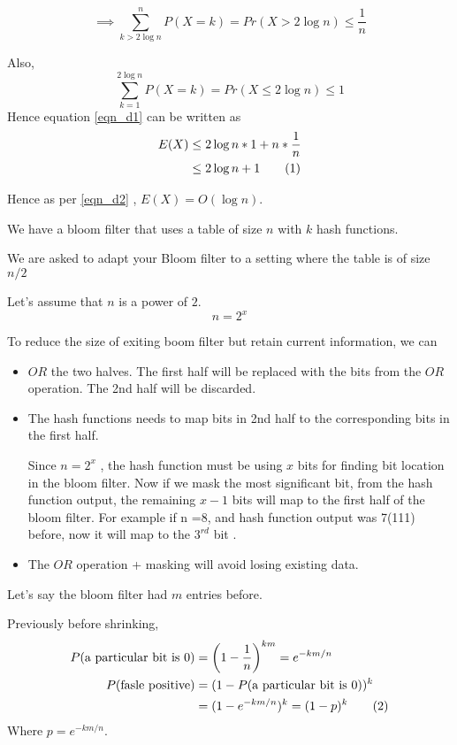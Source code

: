 \documentclass{homeworg}
\newcommand\numberthis{\addtocounter{equation}{1}\tag{\theequation}}
\begin{document}
\[
    \implies \sum_{k > 2\log n}^n P(X=k) = Pr({X> 2 \log n}) \le \frac{1}{n}
\]

Also,
\[
    \sum_{k=1}^{2\log n} P(X=k) = Pr({X\le 2 \log n}) \le 1
\]
Hence equation \ref{eqn_d1} can be written as
\begin{align*}
    E(X) &\le 2 \log n \ast 1 +n \ast \frac{1}{n}\\
    &\le 2\log n +1 \numberthis\label{eqn_d2}
\end{align*}

Hence as per \ref{eqn_d2} ,     $E(X) = O(\log n)$.

\newpage
\exercise
We have a bloom filter that uses a table of size $n$ with $k$ hash functions.

We are asked to adapt your Bloom filter to a setting where the table is of size $n/2$

Let's assume that $n$ is a power of $2$.
\[
    n = 2^x
\]

To reduce the size of exiting boom filter but retain current information, we can \begin{itemize}
    \item $OR$ the two halves. The first half will be replaced with the bits from the $OR$ operation. The 2nd half will be discarded.
    \item The hash functions needs to map bits in 2nd half to the corresponding bits in the first half. 
    
    Since $n=2^x$ , the hash function must be using $x$ bits for finding bit location in the bloom filter. Now if we mask the most significant bit, from the hash function output, the remaining $x-1$ bits will map to the first half of the bloom filter. For example if n =8, and hash function output was 7(111) before, now it will map to the $3^{rd}$ bit .
    \item The $OR$ operation + masking will avoid losing existing data.
\end{itemize}

Let's say the bloom filter had $m$ entries before. 

Previously before shrinking, 
\begin{align*}
    P(\text{a particular bit is 0}) &= \left(1-\frac{1}{n}\right)^{km} = e^{-km/n}\\
    P(\text{fasle positive}) &= (1-P(\text{a particular bit is 0}))^k\\
    &= (1-e^{-km/n})^k = (1-p)^k\numberthis\label{eqn_3_before}
\end{align*}
Where $p = e^{-km/n}$.
\end{document}

